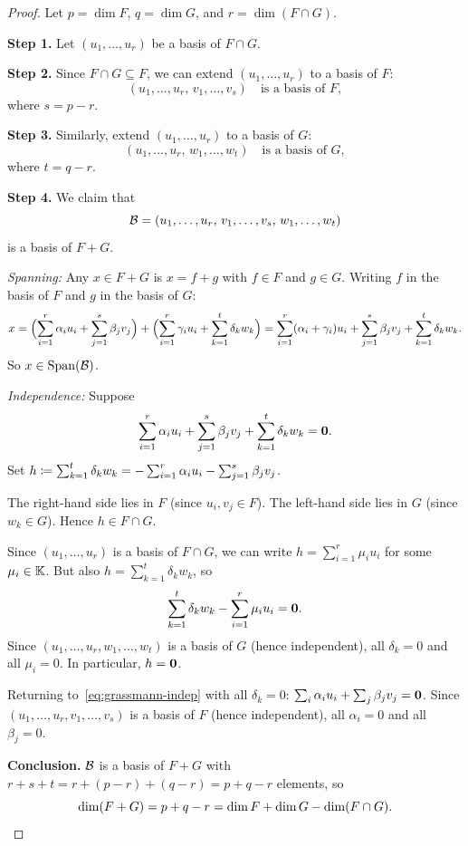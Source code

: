 \begin{proof}
Let $p = \dim F$, $q = \dim G$, and $r = \dim(F\cap G)$.

\textbf{Step 1.} Let $(u_1,\ldots,u_r)$ be a basis of $F\cap G$.

\textbf{Step 2.} Since $F\cap G\subseteq F$, we can extend
$(u_1,\ldots,u_r)$ to a basis of $F$:
\[
  (u_1,\ldots,u_r,\,v_1,\ldots,v_s) \quad\text{is a basis of } F,
\]
where $s = p - r$.

\textbf{Step 3.} Similarly, extend $(u_1,\ldots,u_r)$ to a basis of $G$:
\[
  (u_1,\ldots,u_r,\,w_1,\ldots,w_t) \quad\text{is a basis of } G,
\]
where $t = q - r$.

\textbf{Step 4.} We claim that
\[
  {\mathcal{B}} = (u_1,\ldots,u_r,\,v_1,\ldots,v_s,\,w_1,\ldots,w_t)
\]
is a basis of $F+G$.

\textit{Spanning:} Any $x\in F+G$ is $x = f+g$ with $f\in F$ and
$g\in G$. Writing $f$ in the basis of $F$ and $g$ in the basis of $G$:
\[
  x = \Bigl(\sum_{i=1}^r \alpha_i u_i + \sum_{j=1}^s \beta_j v_j\Bigr)
    + \Bigl(\sum_{i=1}^r \gamma_i u_i + \sum_{k=1}^t \delta_k w_k\Bigr)
  = \sum_{i=1}^r(\alpha_i+\gamma_i)u_i
    + \sum_{j=1}^s\beta_j v_j
    + \sum_{k=1}^t\delta_k w_k.
\]
So $x\in\operatorname{Span}({\mathcal{B}})$.

\textit{Independence:} Suppose
\begin{equation}\label{eq:grassmann-indep}
  \sum_{i=1}^r \alpha_i u_i + \sum_{j=1}^s \beta_j v_j
  + \sum_{k=1}^t \delta_k w_k = \mathbf{0}.
\end{equation}
Set $h \coloneqq \sum_{k=1}^t\delta_k w_k =
-\sum_{i=1}^r\alpha_i u_i - \sum_{j=1}^s\beta_j v_j$.

The right-hand side lies in $F$ (since $u_i,v_j\in F$). The left-hand
side lies in $G$ (since $w_k\in G$). Hence $h\in F\cap G$.

Since $(u_1,\ldots,u_r)$ is a basis of $F\cap G$, we can write
$h = \sum_{i=1}^r\mu_i u_i$ for some $\mu_i\in{\mathbb{K}}$. But also
$h = \sum_{k=1}^t\delta_k w_k$, so
\[
  \sum_{k=1}^t\delta_k w_k - \sum_{i=1}^r\mu_i u_i = \mathbf{0}.
\]
Since $(u_1,\ldots,u_r,w_1,\ldots,w_t)$ is a basis of $G$ (hence
independent), all $\delta_k = 0$ and all $\mu_i = 0$. In particular,
$h = \mathbf{0}$.

Returning to~\eqref{eq:grassmann-indep} with all $\delta_k=0$:
$\sum_i\alpha_iu_i + \sum_j\beta_jv_j = \mathbf{0}$. Since
$(u_1,\ldots,u_r,v_1,\ldots,v_s)$ is a basis of $F$ (hence independent),
all $\alpha_i = 0$ and all $\beta_j = 0$.

\textbf{Conclusion.} ${\mathcal{B}}$ is a basis of $F+G$ with
$r + s + t = r + (p-r) + (q-r) = p+q-r$ elements, so
\[
  \dim(F+G) = p + q - r = \dim F + \dim G - \dim(F\cap G). \qedhere
\]
\end{proof}

